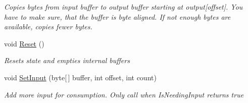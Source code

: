 \begin{DoxyCompactItemize}
\begin{DoxyCompactList}\small\item\em Copies bytes from input buffer to output buffer starting at output\mbox{[}offset\mbox{]}. You have to make sure, that the buffer is byte aligned. If not enough bytes are available, copies fewer bytes. \end{DoxyCompactList}\item 
void \hyperlink{class_i_c_sharp_code_1_1_sharp_zip_lib_1_1_zip_1_1_compression_1_1_streams_1_1_stream_manipulator_aabf3e7c177c54bd0ad7fece9398de28b}{Reset} ()
\begin{DoxyCompactList}\small\item\em Resets state and empties internal buffers \end{DoxyCompactList}\item 
void \hyperlink{class_i_c_sharp_code_1_1_sharp_zip_lib_1_1_zip_1_1_compression_1_1_streams_1_1_stream_manipulator_a48c7062804a7b9b6be6008ba90e7038c}{Set\+Input} (byte\mbox{[}$\,$\mbox{]} buffer, int offset, int count)
\begin{DoxyCompactList}\small\item\em Add more input for consumption. Only call when Is\+Needing\+Input returns true \end{DoxyCompactList}\end{DoxyCompactItemize}
